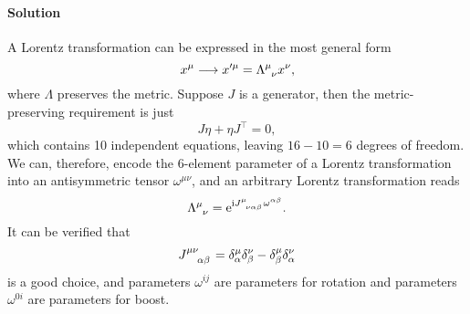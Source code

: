 \documentclass[hyperref, a4paper]{article}
\newcommand*{\ii}{\mathrm{i}}
\newcommand*{\ee}{\mathrm{e}}
\begin{document}
\paragraph{Solution} A Lorentz transformation can be expressed in the most general form
\begin{equation}
    x^\mu \longrightarrow x'^\mu = \Lambda\indices{^\mu_\nu} x^\nu,
\end{equation}
where $\Lambda$ preserves the metric. Suppose $J$ is a generator, then the metric-preserving requirement is just 
\begin{equation}
    J \eta + \eta J^\top = 0,
\end{equation}
which contains 10 independent equations, leaving $16-10=6$ degrees of freedom.
We can, therefore, encode the 6-element parameter of a Lorentz transformation into an antisymmetric tensor $\omega^{\mu \nu}$, and an arbitrary Lorentz transformation reads
\begin{equation}
    \Lambda\indices{^\mu_\nu} = \ee^{\ii J\indices{^\mu_\nu_\alpha_\beta} \omega^{\alpha \beta}}.
\end{equation}
It can be verified that 
\begin{equation}
    J\indices{^\mu^\nu_\alpha_\beta} = \delta^\mu_\alpha \delta^\nu_\beta - \delta^\mu_\beta \delta^\nu_\alpha
\end{equation}
is a good choice, and parameters $\omega^{ij}$ are parameters for rotation and parameters $\omega^{0i}$ are parameters for boost. 
\end{document}
